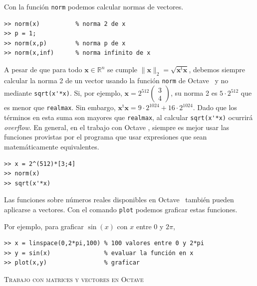 \documentclass[letter,11pt]{article}
\newcommand\R{\mathbb{R}}
\newcommand\0{\mathbf{0}}
\newcommand{\octave}{{\sc Octave }}
\begin{document}
\medskip
				
	Con la funci\'on \Verb+norm+ podemos calcular normas de vectores.

	\medskip

\begin{lstlisting}
>> norm(x)          % norma 2 de x
>> p = 1;
>> norm(x,p)        % norma p de x
>> norm(x,inf)      % norma infinito de x
\end{lstlisting}

\medskip	

	A pesar de que para todo $\boldsymbol{x} \in \R^n$ se cumple
	$\|\boldsymbol{x}\|_2 = \sqrt{\boldsymbol{x}^{\text{t}}\boldsymbol{x}}$, debemos siempre calcular la norma 2 de
	un vector usando la funci\'on \Verb+norm+ de \octave\, y no mediante
	\Verb+sqrt(x'*x)+. Si, por ejemplo,
	$\boldsymbol{x} = 2^{512}\begin{pmatrix}3\\4\end{pmatrix}$, su norma 2
	es $5\cdot 2^{512}$ que es menor que \Verb+realmax+.
	Sin embargo,
	$\boldsymbol{x}^{\text{t}}\boldsymbol{x} = 9\cdot 2^{1024} + 16\cdot 2^{1024}$.
	Dado que los t\'erminos en esta suma son mayores que \Verb+realmax+,
	al calcular \Verb+sqrt(x'*x)+ ocurrir\'a {\em overflow}.
	En general, en el trabajo con \octave, siempre es mejor usar las funciones 	provistas por el programa que usar expresiones que sean matem\'aticamente equivalentes.
	
	\medskip

\begin{lstlisting}
>> x = 2^(512)*[3;4]
>> norm(x)
>> sqrt(x'*x)
\end{lstlisting}

\medskip				
				
	Las funciones sobre n\'umeros reales disponibles en \octave\, tambi\'en pueden
	aplicarse a vectores. Con el comando \Verb+plot+ podemos graficar estas funciones.
	
	Por ejemplo, para graficar $\sin(x)$ con $x$ entre 0 y $2\pi$,
	
	\medskip

\begin{lstlisting}
>> x = linspace(0,2*pi,100) % 100 valores entre 0 y 2*pi
>> y = sin(x)               % evaluar la función en x
>> plot(x,y)                % graficar
\end{lstlisting}

\bigskip
\centerline{\textsc{Trabajo con matrices y vectores en \octave}}
\medskip
\end{document}
